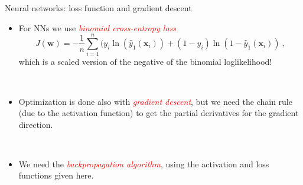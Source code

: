 \documentclass[10pt,ignorenonframetext,]{beamer}
\providecommand{\tightlist}{%
  \setlength{\itemsep}{0pt}\setlength{\parskip}{0pt}}
\begin{document}
\begin{frame}

\begin{block}{Neural networks: loss function and gradient descent}

\vspace{2mm}

\begin{itemize}
\tightlist
\item
  For NNs we use \emph{\textcolor{red}{binomial cross-entropy loss}}
  \[ J({\boldsymbol w})=-\frac{1}{n}\sum_{i=1}^n (y_i\ln({\hat{y}_1({\boldsymbol x}_i)})+(1-y_i)\ln(1-{\hat{y}_1({\boldsymbol x}_i)}) \ , \]
  which is a scaled version of the negative of the binomial
  loglikelihood!
\end{itemize}

\(~\)

\begin{itemize}
\tightlist
\item
  Optimization is done also with
  \emph{\textcolor{red}{gradient descent}}, but we need the chain rule
  (due to the activation function) to get the partial derivatives for
  the gradient direction.
\end{itemize}

\(~\)

\begin{itemize}
\tightlist
\item
  We need the \emph{\textcolor{red}{backpropagation algorithm}}, using
  the activation and loss functions given here.
\end{itemize}

\end{block}

\end{frame}
\end{document}
